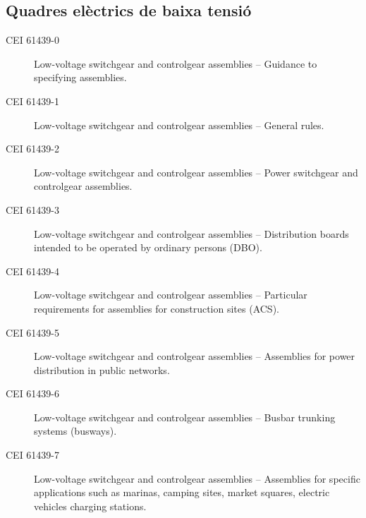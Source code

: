 \subsection*{Quadres elèctrics de baixa tensió}
\begin{description}
    \item [\hspace{5mm}CEI 61439-0] Low-voltage switchgear and controlgear assemblies -- Guidance to specifying assemblies.
    \item [\hspace{5mm}CEI 61439-1] Low-voltage switchgear and controlgear assemblies -- General rules.
    \item [\hspace{5mm}CEI 61439-2] Low-voltage switchgear and controlgear assemblies -- Power switchgear and controlgear assemblies.
    \item [\hspace{5mm}CEI 61439-3] Low-voltage switchgear and controlgear assemblies -- Distribution boards intended to be operated by ordinary persons (DBO).
    \item [\hspace{5mm}CEI 61439-4] Low-voltage switchgear and controlgear assemblies -- Particular requirements for assemblies for construction sites (ACS).
    \item [\hspace{5mm}CEI 61439-5] Low-voltage switchgear and controlgear assemblies -- Assemblies for power distribution in public networks.
    \item [\hspace{5mm}CEI 61439-6] Low-voltage switchgear and controlgear assemblies -- Busbar trunking systems (bus\-ways).
    \item [\hspace{5mm}CEI 61439-7] Low-voltage switchgear and controlgear assemblies -- Assemblies for specific applications such as marinas, camping sites, market squares, electric vehicles charging stations.
\end{description}




